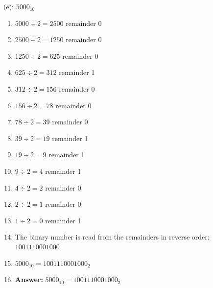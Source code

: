 \documentclass{article}
\begin{document}
\noindent (e): $5000_{10}$

\begin{enumerate}
    \item $5000 \div 2 = 2500$ remainder 0
    \item $2500 \div 2 = 1250$ remainder 0
    \item $1250 \div 2 = 625$ remainder 0
    \item $625 \div 2 = 312$ remainder 1
    \item $312 \div 2 = 156$ remainder 0
    \item $156 \div 2 = 78$ remainder 0
    \item $78 \div 2 = 39$ remainder 0
    \item $39 \div 2 = 19$ remainder 1
    \item $19 \div 2 = 9$ remainder 1
    \item $9 \div 2 = 4$ remainder 1
    \item $4 \div 2 = 2$ remainder 0
    \item $2 \div 2 = 1$ remainder 0
    \item $1 \div 2 = 0$ remainder 1
    \item The binary number is read from the remainders in reverse order: $1001110001000$
    \item $5000_{10} = 1001110001000_2$
    \item \textbf{Answer:} $5000_{10} = 1001110001000_2$
\end{enumerate}
\end{document}

